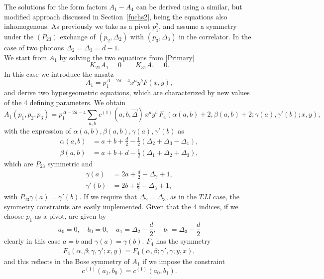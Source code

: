 \documentclass[a4paper,11pt,openright,twoside]{book}
\let\a=\alpha   \let\b=\beta   \let\g=\gamma   \let\d=\delta
\newcommand{\secref}[1]{Section~\ref{#1}}		%
\numberwithin{equation}{section}
\begin{document}
{{{The solutions for the form factors $A_1-A_4$ can be derived using a similar, but modified approach discussed in \secref{fuchs2}, being the equations also inhomogenous. As previously we take as a pivot $p_1^2$, and assume a symmetry under the $(P_{23})$ exchange of $(p_2,\Delta_2)$ with $(p_3,\Delta_3)$ in the correlator. In the case of two photons $\Delta_2=\Delta_3=d-1$.\\
We start from $A_1$ by solving the two equations from \eqref{Primary}
\begin{equation}
	K_{21}A_1=0   \qquad K_{31}A_1=0.
\end{equation}
In this case we introduce the ansatz 
\begin{equation}
	A_1=p_1^{\Delta-2 d - 4}x^a y^b  F(x,y),
\end{equation}
and derive two hypergeometric equations, which are characterized by new values of the 4 defining parameters. 
We obtain 
\begin{equation}
	\label{A1tjj}
	A_1(p_1,p_2,p_3)=p_1^{\Delta-2 d - 4}\sum_{a,b} c^{(1)}(a,b,\vec{\Delta})\,x^a y^b \,F_4(\alpha(a,b) +2, \beta(a,b)+2; \gamma(a), \gamma'(b); x, y),
\end{equation}
with the expression of $\alpha(a,b),\beta(a,b), \gamma(a), \gamma'(b)$ as 
\begin{equation}
	\label{consA1}
	\begin{split}
		\alpha(a,b)&= a + b + \frac{d}{2} -\frac{1}{2}(\Delta_2 + \Delta_3 -\Delta_1),\\
		\beta(a,b)&= a + b + d -\frac{1}{2}(\Delta_1 + \Delta_2 +\Delta_3),
	\end{split}
\end{equation}
which are $P_{23}$ symmetric and 
\begin{equation} 
	\label{consA12}
	\begin{split}
		\gamma(a)& =2 a +\frac{d}{2} -\Delta_2 + 1,\\
		\gamma'(b)&=2 b +\frac{d}{2} -\Delta_3 + 1,
	\end{split}
\end{equation}
with $P_{23}\gamma(a)=\gamma'(b)$.
If we require that $\Delta_2=\Delta_3$, as in the $TJJ$ case, the symmetry constraints are easily implemented. 
Given that the 4 indices, if we choose $p_1$ as a pivot, are given by 
\begin{equation}
	a_0=0,\quad b_0=0,\quad a_1=\Delta_2- \frac{d}{2},\quad b_1=\Delta_3-\frac{d}{2} 
\end{equation}
clearly in this case $a=b$ and $\gamma(a)=\gamma(b)$. 
$F_4$ has the symmetry 
\begin{align}
	F_4(\a,\b; \g, \g' ; x,y)=F_4(\a,\b; \g', \g ; y,x),
\end{align}
and this reflects in the Bose symmetry of $A_1$ if we impose the constraint
\begin{equation}
	c^{(1)}(a_1,b_0)=c^{(1)}(a_0,b_1).
\end{equation}

}}}
\end{document}
